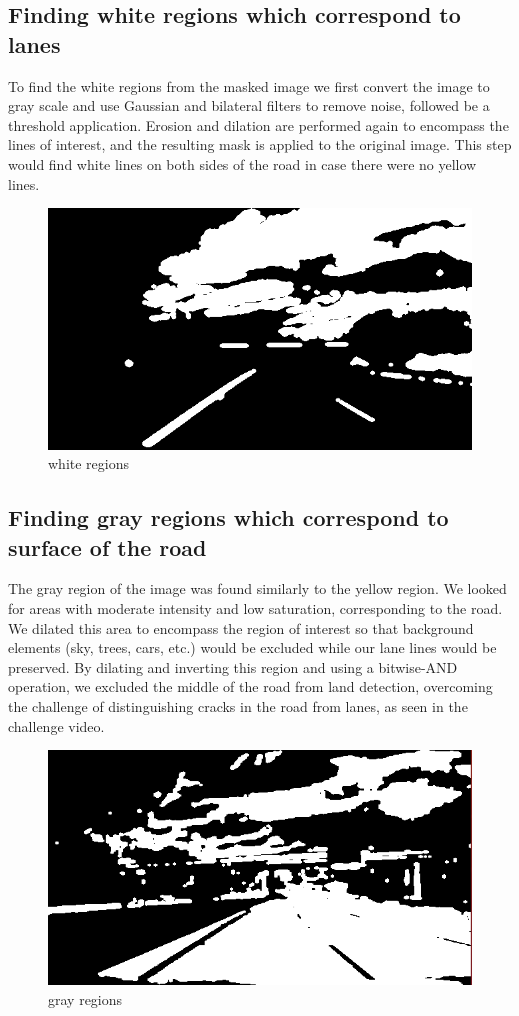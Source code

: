 \documentclass[12pt]{report}
\begin{document}
{\subsection*{Finding white regions which correspond to lanes}
To find the white regions from the masked image we first convert the image to gray scale and use Gaussian and bilateral filters to remove noise, followed be a threshold application.  Erosion and dilation are performed again to encompass the lines of interest, and the resulting mask is applied to the original image.  This step would find white lines on both sides of the road in case there were no yellow lines.
\begin{figure}[h!]
    \centering
    \includegraphics[scale=0.4]{white__01__01.png}
    \caption{white regions}
    \label{fig:my_label2}
\end{figure}
\subsection*{Finding gray regions which correspond to surface of the road}
The gray region of the image was found similarly to the yellow region.  We looked for areas with moderate intensity and low saturation, corresponding to the road.  We dilated this area to encompass the region of interest so that background elements (sky, trees, cars, etc.) would be excluded while our lane lines would be preserved.  By dilating and inverting this region and using a bitwise-AND operation, we excluded the middle of the road from land detection, overcoming the challenge of distinguishing cracks in the road from lanes, as seen in the challenge video.
\begin{figure}[h!]
    \centering
    \includegraphics[scale=0.4]{gray__01.png}
    \caption{gray regions}
    \label{fig:my_label2}
\end{figure}
}
\end{document}
